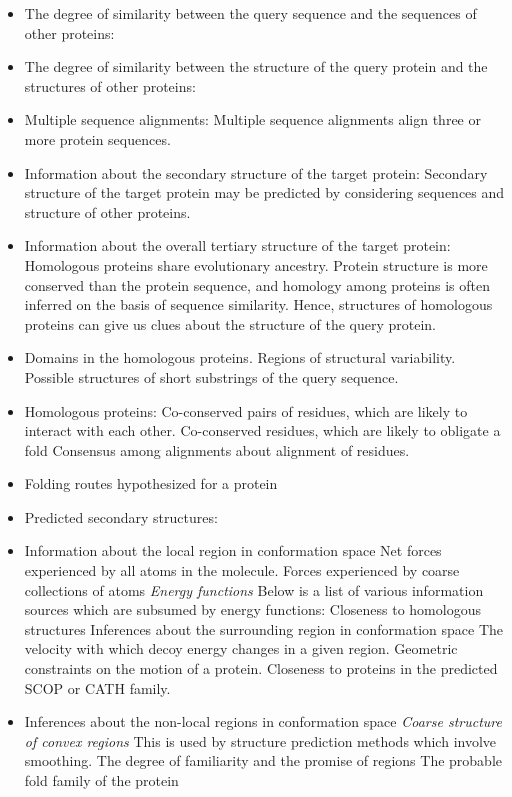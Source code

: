 \documentclass[10pt]{report}
\begin{document}
\begin{itemize}

 \item The degree of similarity between the query sequence and the sequences of other proteins: 
 \item The degree of similarity between the structure of the query protein and the structures of other proteins:
 \item Multiple sequence alignments: Multiple sequence alignments align three or more protein sequences.
 \item Information about the secondary structure of the target protein: Secondary structure of the target protein may be predicted by considering sequences and structure of other proteins.
 \item Information about the overall tertiary structure of the target protein: Homologous proteins share evolutionary ancestry. Protein structure is more conserved than the protein sequence, and homology among proteins is often inferred on the basis of sequence similarity. Hence, structures of homologous proteins can give us clues about the structure of the query protein.
 \item Domains in the homologous proteins.
 \subitem Regions of structural variability.
 \subitem Possible structures of short substrings of the query sequence.

 \item Homologous proteins: 
 \subitem Co-conserved pairs of residues, which are likely to interact with each other.
 \subitem Co-conserved residues, which are likely to obligate a fold
 \subitem Consensus among alignments about alignment of residues.

 \item Folding routes hypothesized for a protein
 \item Predicted secondary structures:

\end{itemize}



\begin{itemize}
 \item Information about the local region in conformation space
 \subitem Net forces experienced by all atoms in the molecule.
 \subitem Forces experienced by coarse collections of atoms
 \subitem \textit{Energy functions} Below is a list of various information sources which are subsumed by energy functions:
 \subitem Closeness to homologous structures
 \subitem Inferences about the surrounding region in conformation space
 \subitem The velocity with which decoy energy changes in a given region.
 \subitem Geometric constraints on the motion of a protein.
 \subitem Closeness to proteins in the predicted SCOP or CATH family.

 \item Inferences about the non-local regions in conformation space
 \subitem \textit{Coarse structure of convex regions} This is used by structure prediction methods which involve smoothing.
 \subitem The degree of familiarity and the promise of regions
 \subitem The probable fold family of the protein
\end{itemize}
\end{document}
